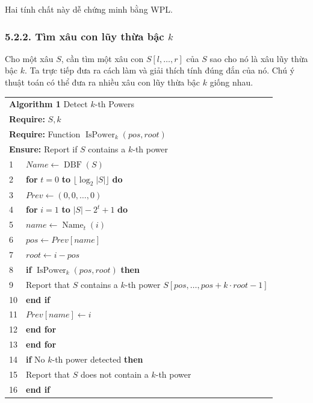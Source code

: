 \documentclass[11pt]{article}
\begin{document}
Hai tính chất này dễ chứng minh bằng WPL.

\subsubsection*{5.2.2. Tìm xâu con lũy thừa bậc \texorpdfstring{\(k\)}{k}}

Cho một xâu \(S\), cần tìm một xâu con \(S[l,\ldots,r]\) của \(S\) sao cho nó
là xâu lũy thừa bậc \(k\). Ta trực tiếp đưa ra cách làm và giải thích tính
đúng đắn của nó. Chú ý thuật toán có thể đưa ra nhiều xâu con lũy thừa bậc
\(k\) giống nhau.

\begin{center}
\begin{tabular}{ll}
\multicolumn{2}{l}{\textbf{Algorithm 1} Detect \(k\)-th Powers}\\
\multicolumn{2}{l}{\textbf{Require:} \(S,k\)}\\
\multicolumn{2}{l}{\textbf{Require:} Function \(\operatorname{IsPower}_k(\mathit{pos},\mathit{root})\)}\\
\multicolumn{2}{l}{\textbf{Ensure:} Report if \(S\) contains a \(k\)-th power}\\
1 & \(\mathit{Name}\leftarrow \operatorname{DBF}(S)\)\\
2 & \textbf{for} \(t=0\) \textbf{to} \(\lfloor\log_2|S|\rfloor\) \textbf{do}\\
3 & \quad \(\mathit{Prev}\leftarrow (0,0,\ldots,0)\)\\
4 & \quad \textbf{for} \(i=1\) \textbf{to} \(|S|-2^t+1\) \textbf{do}\\
5 & \quad\quad \(\mathit{name}\leftarrow \operatorname{Name}_t(i)\)\\
6 & \quad\quad \(\mathit{pos}\leftarrow \mathit{Prev}[\mathit{name}]\)\\
7 & \quad\quad \(\mathit{root}\leftarrow i-\mathit{pos}\)\\
8 & \quad\quad \textbf{if} \(\operatorname{IsPower}_k(\mathit{pos},\mathit{root})\) \textbf{then}\\
9 & \quad\quad\quad Report that \(S\) contains a \(k\)-th power
      \(S[\mathit{pos},\ldots,\mathit{pos}+k\cdot\mathit{root}-1]\)\\
10 & \quad\quad \textbf{end if}\\
11 & \quad\quad \(\mathit{Prev}[\mathit{name}]\leftarrow i\)\\
12 & \quad \textbf{end for}\\
13 & \textbf{end for}\\
14 & \textbf{if} No \(k\)-th power detected \textbf{then}\\
15 & \quad Report that \(S\) does not contain a \(k\)-th power\\
16 & \textbf{end if}
\end{tabular}
\end{center}
\end{document}
